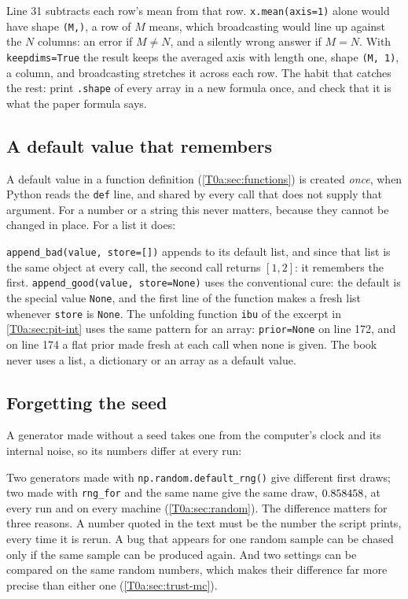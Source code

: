 Line 31 subtracts each row's mean from that row. \texttt{x.mean(axis=1)} alone would have shape \texttt{(M,)}, a row of $M$ means, which broadcasting would line up against the $N$ columns: an error if $M\neq N$, and a silently wrong answer if $M=N$. With \texttt{keepdims=True} the result keeps the averaged axis with length one, shape \texttt{(M, 1)}, a column, and broadcasting stretches it across each row. The habit that catches the rest: print \texttt{.shape} of every array in a new formula once, and check that it is what the paper formula says.

\subsection{A default value that remembers}
\label{T0a:sec:pit-default}

A default value in a function definition (\cref{T0a:sec:functions}) is created \emph{once}, when Python reads the \texttt{def} line, and shared by every call that does not supply that argument. For a number or a string this never matters, because they cannot be changed in place. For a list it does:


\texttt{append\_bad(value, store=[])} appends to its default list, and since that list is the same object at every call, the second call returns $[1,2]$: it remembers the first. \texttt{append\_good(value, store=None)} uses the conventional cure: the default is the special value \texttt{None}, and the first line of the function makes a fresh list whenever \texttt{store} is \texttt{None}. The unfolding function \texttt{ibu} of the excerpt in \cref{T0a:sec:pit-int} uses the same pattern for an array: \texttt{prior=None} on line 172, and on line 174 a flat prior made fresh at each call when none is given. The book never uses a list, a dictionary or an array as a default value.

\subsection{Forgetting the seed}
\label{T0a:sec:pit-seed}

A generator made without a seed takes one from the computer's clock and its internal noise, so its numbers differ at every run:


Two generators made with \texttt{np.random.default\_rng()} give different first draws; two made with \texttt{rng\_for} and the same name give the same draw, $0.858458$, at every run and on every machine (\cref{T0a:sec:random}). The difference matters for three reasons. A number quoted in the text must be the number the script prints, every time it is rerun. A bug that appears for one random sample can be chased only if the same sample can be produced again. And two settings can be compared on the same random numbers, which makes their difference far more precise than either one (\cref{T0a:sec:trust-mc}).

